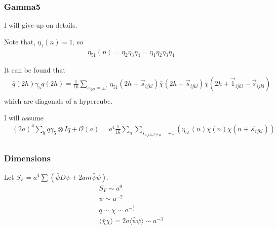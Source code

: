 \subsubsection{\label{sec:gamma5ks}Gamma5}

I will give up on details.

Note that, $\eta _1(n)=1$, so
\begin{equation}
\begin{split}
&\eta_{51}(n)=\eta _2\eta_3\eta_4=\eta _1\eta _2\eta_3\eta_4
\end{split}
\end{equation} 

It can be found that
\begin{equation}
\begin{split}
&\bar{q}(2h)\gamma _5 q (2h)=\frac{1}{16}\sum _{s_{ijkl}=\pm 1}\eta_{51}(2h+\vec{s}_{ijkl})\bar{\chi}(2h+\vec{s}_{ijkl})\chi (2h+\vec{1}_{ijkl}-\vec{s}_{ijkl})\\
\end{split}
\end{equation} 
which are diagonals of a hypercube.

I will assume
\textcolor[rgb]{0,0,1}{
\begin{equation}
\begin{split}
&(2a)^4\sum _h \bar{q}\gamma _5\otimes I q + \mathcal{O}(a) = a^4 \frac{1}{16}\sum _n \sum _{s_{i,j,k,l\neq \mu }=\pm 1}\left(\eta _{51}(n)\bar{\chi}(n)\chi(n+\vec{s}_{ijkl})\right)\\
\end{split}
\end{equation}
}


\subsubsection{\label{sec:gammaksdimension}Dimensions}

Let $S_F= a^4 \sum \left(\bar{\psi} D \psi + 2am \bar{\psi}\psi\right)$.
\textcolor[rgb]{0,0,1}{
\begin{equation}
\begin{split}
&S_F\sim a^0\\
&\psi\sim a^{-2}\\
&q\sim \chi\sim a^{-\frac{3}{2}}\\
&\langle \bar{\chi}\chi \rangle  = 2 a \langle \bar{\psi}\psi \rangle \sim a^{-3}\\
\end{split}
\end{equation}
}

